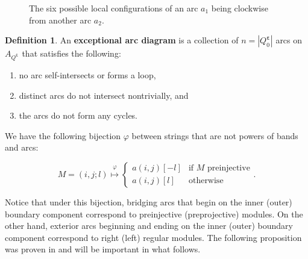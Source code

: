 \documentclass[12pt]{amsart}
\theoremstyle{plain}
\theoremstyle{definition}
\newtheorem{defn}{Definition}[section]
\theoremstyle{remark}
\begin{document}
\begin{figure}
\begin{center}
\begin{tikzpicture}[x=0.75pt,y=0.75pt,yscale=-1,xscale=1]
\end{tikzpicture}

\end{center}
\caption{The six possible local configurations of an arc $a_1$ being clockwise from another arc $a_2$.}
\label{fig: 6 possible local configurations on Annulus}
\end{figure}

\begin{defn}
An \textbf{exceptional arc diagram} is a collection of $n = |Q_0^{\bm{\varepsilon}}|$ arcs on $A_{Q^{\bm{\varepsilon}}}$ that satisfies the following: 
\begin{enumerate}
\item no arc self-intersects or forms a loop,
\item distinct arcs do not intersect nontrivially, and 
\item the arcs do not form any cycles. 
\end{enumerate}

\end{defn}

\smallskip

\noindent
We have the following bijection $\varphi$ between strings {\color{black} that are not powers of bands} and arcs:

 \[ M = (i,j;l) \overset{\varphi}{\mapsto} \begin{cases} 
          a(i,j)[-l] & \text{if $M$ preinjective} \\
          a(i,j)[l] & \text{otherwise}
       \end{cases}.
    \]
    
Notice that under this bijection, bridging arcs that begin on the inner (outer) boundary component correspond to preinjective (preprojective) modules. On the other hand, exterior arcs beginning and ending on the inner (outer) boundary component correspond to right (left) regular modules. The following proposition was proven in \cite{maresca2022combinatorics} and will be important in what follows.
\end{document}
